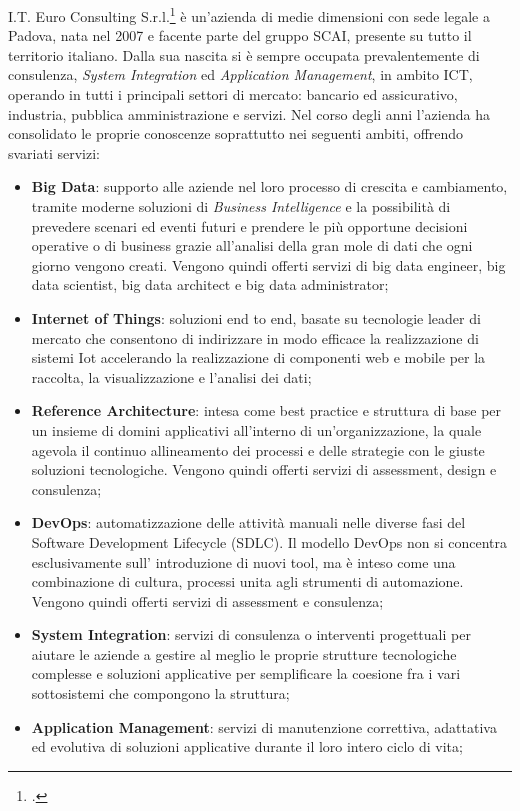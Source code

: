 I.T. Euro Consulting S.r.l.\footcite{https://www.itecons.it} è un'azienda di medie dimensioni con sede legale a Padova, nata nel 2007 e facente parte del gruppo SCAI, presente su tutto il territorio italiano. 
Dalla sua nascita si è sempre occupata prevalentemente di consulenza, \textit{System Integration} ed \textit{Application Management}, in ambito ICT, operando in tutti i principali settori di mercato: bancario ed assicurativo, industria, pubblica amministrazione e servizi.
Nel corso degli anni l'azienda ha consolidato le proprie conoscenze soprattutto nei seguenti ambiti, offrendo svariati servizi:
\begin{itemize}
	\item \textbf{Big Data}: supporto alle aziende nel loro processo di crescita e cambiamento, tramite moderne soluzioni di \textit{Business Intelligence} e la possibilità di prevedere scenari ed eventi futuri e prendere le più opportune decisioni operative o di business grazie all'analisi della gran mole di dati che ogni giorno vengono creati. Vengono quindi offerti servizi di big data engineer, big data scientist, big data architect e big data administrator;
	\item \textbf{Internet of Things}: soluzioni end to end, basate su tecnologie leader di mercato che consentono di indirizzare in modo efficace la realizzazione di sistemi Iot accelerando la realizzazione di componenti web e mobile per la raccolta, la visualizzazione e l’analisi dei dati;
	\item \textbf{Reference Architecture}: intesa come best practice e struttura di base per un insieme di domini applicativi all’interno di un’organizzazione, la quale agevola il continuo allineamento dei processi e delle strategie con le giuste soluzioni tecnologiche. Vengono quindi offerti servizi di assessment, design e consulenza;
	\item \textbf{DevOps}: automatizzazione delle attività manuali nelle diverse fasi del \gls{Software Development Lifecycle (SDLC)}. Il modello DevOps non si concentra esclusivamente sull’ introduzione di nuovi tool, ma è inteso come una combinazione di cultura, processi unita agli strumenti di automazione. Vengono quindi offerti servizi di assessment e consulenza; 
	\item \textbf{System Integration}: servizi di consulenza o interventi progettuali per aiutare le aziende a gestire al meglio le proprie strutture tecnologiche complesse e soluzioni applicative per semplificare la coesione fra i vari sottosistemi che compongono la struttura;
	\item \textbf{Application Management}: servizi di manutenzione correttiva, adattativa ed evolutiva di soluzioni applicative durante il loro intero ciclo di vita;

\end{itemize}
